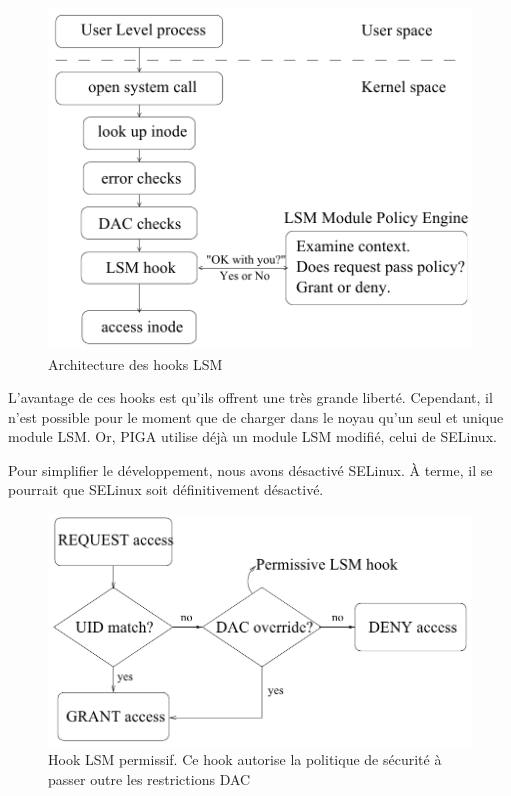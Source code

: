 \begin{figure}[hb]
	\centering
	\includegraphics[scale=0.45]{lsm1.png}
	\caption{Architecture des hooks LSM \cite{LSMINTRO}}
\end{figure}

L'avantage de ces hooks est qu'ils offrent une très grande liberté. Cependant, il n'est possible pour le moment que de charger dans le noyau qu'un seul et unique module LSM. Or, PIGA utilise déjà un module LSM modifié, celui de SELinux.

Pour simplifier le développement, nous avons désactivé SELinux. \`A terme, il se pourrait que SELinux soit définitivement désactivé.

\begin{figure}%
	\centering
	\includegraphics[scale=0.45]{lsm2.png}
	\caption{Hook LSM permissif. Ce hook autorise la politique de sécurité à passer outre les restrictions DAC \cite{LSMINTRO}}
\end{figure}

